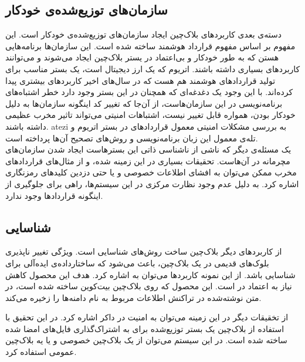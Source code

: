 \subsection{سازمان‌های توزیع‌شده‌ی خودکار}
دسته‌ی بعدی کاربرد‌های بلاک‌چین ایجاد سازمان‌های توزیع‌شده‌ی خودکار 
است. این مفهوم بر اساس مفهوم قرارداد هوشمند
\cite{SmartContract}
 ساخته شده است. این سازمان‌ها برنامه‌هایی هستن که به طور خودکار و بی‌اعتماد در یستر بلاک‌چین ایجاد می‌شوند و می‌توانند کاربرد‌های بسیاری داشته باشند. اتریوم
\cite{Ethereum}
که یک ارز دیجیتال است، یک بستر مناسب برای تولید قرارداد‌های هوشمند هم هست که در سال‌های اخیر کاربرد‌های بیشتری پیدا کرده‌اند. با این وجود یک دغدغه‌ای که همچنان در این بستر وجود دارد خطر اشتباه‌های برنامه‌نویسی در این سازمان‌هاست، از آن‌جا که تغییر کد اینگونه سازمان‌ها به دلیل خودکار بودن، همواره قابل تغییر نیست، اشتباهات امنیتی می‌تواند تاثیر مخرب عظیمی داشته باشند. atezi
\cite{surveyAtt}
به بررسی مشکلات امنیتی معمول قراردادهای در بستر اتریوم و تله‌ی معمول این زبان برنامه‌نویسی و روش‌های تصحیح آن‌ها پرداخته است. 
\\
یک‌ مسئله‌ی دیگر که ناشی از ناشناسی ذاتی این بستر‌هاست ایجاد شدن سازمان‌های مچرمانه در آن‌هاست. تحقیقات‌ بسیاری 
\cite{gyges} \cite{smart}
در این زمینه شده، و از مثال‌های قرارداد‌های مخرب ممکن می‌توان به افشای اطلاعات خصوصی و یا حتی دزدین کلید‌های رمز‌نگاری اشاره کرد. به دلیل عدم وجود نظارت مرکزی در این سیستم‌ها، راهی برای جلوگیری از اینگونه قرارداد‌ها وجود ندارد.
\subsection{شناسایی}
از کاربرد‌های دیگر بلا‌ک‌چین ساخت‌ روش‌های شناسایی
است. ویژگی تغییر ناپذیری بلوک‌های قدیمی در یک بلاک‌چین، باعث می‌شود که ساختارداده‌ی ایده‌آلی برای شناسایی باشد. از این نمونه کاربرد‌ها می‌توان به  اشاره کرد. هدف این محصول کاهش نیاز به اعتماد در 
 
است. این محصول که روی بلاک‌چین بیت‌کوین ساخته شده است، در متن نوشته‌شده در تراکنش اطلاعات مربوط به نام دامنه‌ها را زخیره می‌کند. 
\par
از تخقیقات دیگر در این زمینه می‌توان به امنیت در داکر
\cite{docker}
اشاره کرد. در این تحقیق با استفاده‌ از بلاک‌چین یک بستر توزیع‌شده برای به اشتراک‌گذاری فایل‌های امضا شده ساخته شده است. در این سیستم‌ می‌توان از یک بلاک‌چین خصوصی و یا یه بلاک‌چین عمومی استفاده کرد. 



